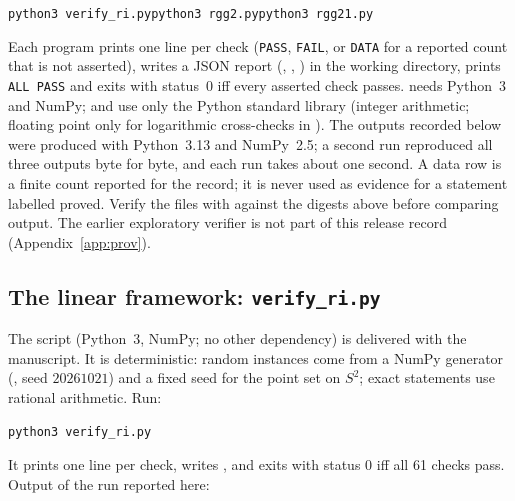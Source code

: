 \documentclass[11pt,a4paper]{article}
\theoremstyle{plain}
\theoremstyle{definition}
\begin{document}
\begin{center}\texttt{python3 verify\_ri.py}\qquad\texttt{python3 rgg2.py}\qquad\texttt{python3 rgg21.py}\end{center}
Each program prints one line per check (\texttt{PASS}, \texttt{FAIL}, or \texttt{DATA} for a reported count that is not asserted), writes a JSON report (, , ) in the working directory, prints \texttt{ALL PASS} and exits with status~$0$ iff every asserted check passes.  needs Python~3 and NumPy;  and  use only the Python standard library (integer arithmetic; floating point only for logarithmic cross-checks in ). The outputs recorded below were produced with Python~3.13 and NumPy~2.5; a second run reproduced all three outputs byte for byte, and each run takes about one second. A data row is a finite count reported for the record; it is never used as evidence for a statement labelled proved. Verify the files with  against the digests above before comparing output. The earlier exploratory verifier  is not part of this release record (Appendix~\ref{app:prov}).

\subsection{The linear framework: \texttt{verify\_ri.py}}
The script  (Python~3, NumPy; no other dependency) is delivered with the manuscript. It is deterministic: random instances come from a NumPy generator (, seed $20261021$) and a fixed seed for the point set on $S^2$; exact statements use rational arithmetic. Run:
\begin{center}\texttt{python3 verify\_ri.py}\end{center}
It prints one line per check, writes , and exits with status $0$ iff all 61 checks pass. Output of the run reported here:
\end{document}
